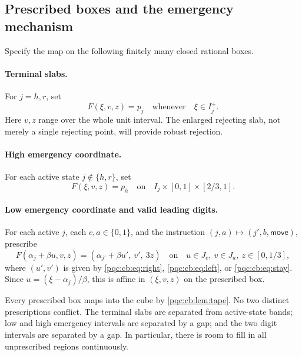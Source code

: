 \documentclass[11pt,letterpaper]{article}
\numberwithin{equation}{section}
\theoremstyle{definition}
\theoremstyle{remark}
\begin{document}
\subsection{Prescribed boxes and the emergency mechanism}

Specify the map on the following finitely many closed rational boxes.

\paragraph{Terminal slabs.}
For $j=h,r$, set
\begin{equation}
 F(\xi,v,z)=p_j\quad\text{whenever}\quad \xi\in I_j^+.
 \label{pqc:cb:eq:terminal}
\end{equation}
Here $v,z$ range over the whole unit interval.  The enlarged rejecting slab,
not merely a single rejecting point, will provide robust rejection.

\paragraph{High emergency coordinate.}
For each active state $j\notin\{h,r\}$, set
\begin{equation}
 F(\xi,v,z)=p_h
 \quad\text{on}\quad I_j\times[0,1]\times[2/3,1].
 \label{pqc:cb:eq:emergency}
\end{equation}

\paragraph{Low emergency coordinate and valid leading digits.}
For each active $j$, each $c,a\in\{0,1\}$, and the instruction
$(j,a)\mapsto(j',b,\mathsf{move})$, prescribe
\begin{equation}
 F(\alpha_j+\beta u,v,z)
   =(\alpha_{j'}+\beta u',\ v',\ 3z)
 \quad\text{on}\quad
 u\in J_c,\ v\in J_a,\ z\in[0,1/3],
 \label{pqc:cb:eq:active}
\end{equation}
where $(u',v')$ is given by \eqref{pqc:cb:eq:right}, \eqref{pqc:cb:eq:left}, or
\eqref{pqc:cb:eq:stay}.  Since $u=(\xi-\alpha_j)/\beta$, this is affine in
$(\xi,v,z)$ on the prescribed box.

Every prescribed box maps into the cube by \cref{pqc:cb:lem:tape}.  No two distinct
prescriptions conflict.  The terminal slabs are separated from active-state
bands; low and high emergency intervals are separated by a gap; and the two
digit intervals are separated by a gap.  In particular, there is room to fill
in all unprescribed regions continuously.
\end{document}

